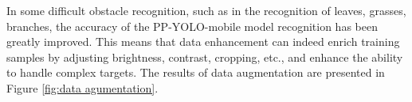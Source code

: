 \documentclass[sensors,article,submit,moreauthors,pdftex]{Definitions/mdpi}
\begin{document}
\begin{paracol}{2}
In some difficult obstacle recognition, such as in the recognition of leaves, grasses, branches, the accuracy of the PP-YOLO-mobile model recognition has been greatly improved. This means that data enhancement can indeed enrich training samples by adjusting brightness, contrast, cropping, etc., and enhance the ability to handle complex targets. The results of data augmentation are presented in Figure \ref{fig:data agumentation}. 

\begin{figure}[H]
\centering
{}
\quad
{}
\quad
{}
\quad
{}
\quad
{}
\end{figure}
\end{paracol}
\end{document}
